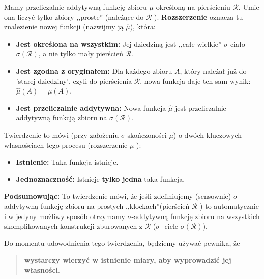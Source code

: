 \begin{remark} 
       Mamy przeliczalnie addytywną funkcję zbioru $\mu $ określoną na pierścieniu   $\mathcal{R}$. Umie ona liczyć tylko zbiory ,,proste'' (należące do $\mathcal{R}$ ). \textbf{Rozszerzenie } oznacza tu znalezienie nowej funkcji (nazwijmy ją $\hat{\mu}$), która:
       \begin{itemize}
       	\item \textbf{Jest określona na wszystkim:} Jej dziedziną jest ,,całe wielkie'' $\sigma$-ciało $\sigma\left( \mathcal{R} \right) $, a nie tylko mały pierścień $\mathcal{R}$.
	\item \textbf{Jest zgodna z oryginałem:} Dla każdego zbioru $A$, który należał już do 'starej dziedziny', czyli do pierścienia $\mathcal{R}$, nowa funkcja daje ten sam wynik: $\hat{\mu}\left( A \right) = \mu\left( A \right) $. 
	\item \textbf{Jest przeliczalnie addytywna:} Nowa funkcja $\hat{\mu}$ jest przeliczalnie addytywną funkcją zbioru na $\sigma\left( \mathcal{R} \right) $. 
       \end{itemize}

       Twierdzenie to mówi (przy założeniu $\sigma$-skończoności $\mu$) o dwóch kluczowych własnościach tego procesu (rozszerzenie $\mu$ ):
       \begin{itemize}
       	\item \textbf{Istnienie:} Taka funkcja istnieje.
	\item \textbf{Jednoznaczność: } Istnieje \textbf{tylko jedna} taka funkcja. 
       \end{itemize}

       \textbf{Podsumowując:} To twierdzenie mówi, że jeśli zdefiniujemy (sensownie) $\sigma$-addytywną funkcję zbioru na prostych ,,klockach''(pierścień $\mathcal{R}$ ) to automatycznie i w jedyny możliwy sposób otrzymamy $\sigma$-addytywną funkcję zbioru na wszystkich skomplikowanych konstrukcji zburowanych z $\mathcal{R}$ ($\sigma$- ciele $\sigma\left( \mathcal{R} \right) $).
\end{remark} 

\vspace{1em}

\noindent Do momentu udowodnienia tego twierdzenia, będziemy używać pewnika, że 
\begin{quote}
	\textbf{wystarczy wierzyć w istnienie miary, aby wyprowadzić jej własności}.
\end{quote} 

